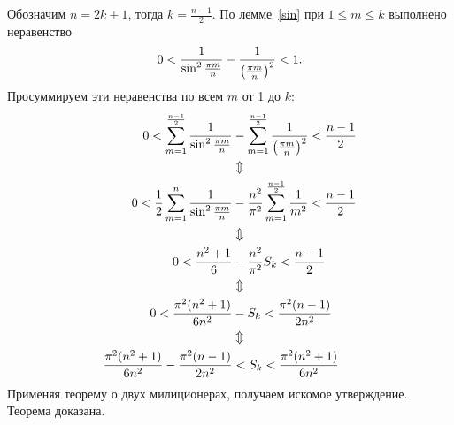 \documentclass[a4paper,12pt,fleqn]{article}
\begin{document}
Обозначим $n = 2k+1$, тогда $k = \frac{n-1}2$. По лемме~\ref{sin} при $1 \le m \le k$ выполнено неравенство
\[
0 < \frac1{\sin^2 \frac{\pi m}{n}} - \frac1{\left(\frac{\pi m}{n}\right)^2} < 1.
\]
Просуммируем эти неравенства по всем $m$ от 1 до $k$:
\[
\begin{aligned}
0 < \sum\limits_{{m=1}}^{{\frac{n-1}2}}\frac1{\sin^2 \frac{\pi m}{n}} &- \sum\limits_{{m=1}}^{{\frac{n-1}2}}\frac1{\left(\frac{\pi m}{n}\right)^2} < \frac{n-1}2 \\
&\Updownarrow \\
0 < \frac12\sum\limits_{{m=1}}^{{n}}\frac1{\sin^2 \frac{\pi m}{n}} &- \frac{n^2}{\pi^2}\sum\limits_{{m=1}}^{{\frac{n-1}2}}\frac1{m^2} < \frac{n-1}2 \\
&\Updownarrow \\
0 < \frac{n^2 + 1}6 &- \frac{n^2}{\pi^2}S_k < \frac{n-1}2 \\
&\Updownarrow \\
0 < \frac{\pi^2(n^2 + 1)}{6n^2} &- S_k < \frac{\pi^2(n-1)}{2n^2} \\
&\Updownarrow \\
\frac{\pi^2(n^2 + 1)}{6n^2} - \frac{\pi^2(n-1)}{2n^2} &< S_k < \frac{\pi^2(n^2 + 1)}{6n^2} \\
\end{aligned}
\]
Применяя теорему о двух милиционерах, получаем искомое утверждение. Теорема доказана.
\end{document}
